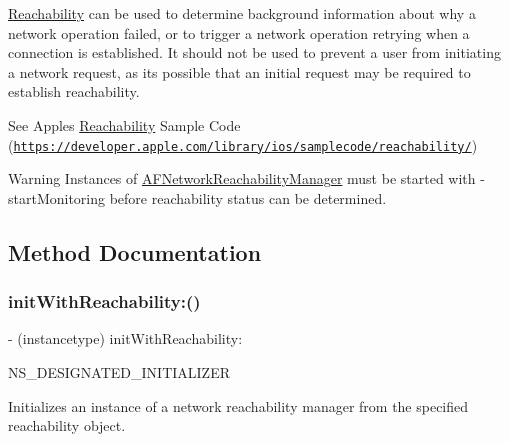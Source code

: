 \mbox{\hyperlink{interface_reachability}{Reachability}} can be used to determine background information about why a network operation failed, or to trigger a network operation retrying when a connection is established. It should not be used to prevent a user from initiating a network request, as it\textquotesingle{}s possible that an initial request may be required to establish reachability.

See Apple\textquotesingle{}s \mbox{\hyperlink{interface_reachability}{Reachability}} Sample Code (\href{https://developer.apple.com/library/ios/samplecode/reachability/}{\tt https\+://developer.\+apple.\+com/library/ios/samplecode/reachability/})

\begin{DoxyWarning}{Warning}
Instances of {\ttfamily \mbox{\hyperlink{interface_a_f_network_reachability_manager}{A\+F\+Network\+Reachability\+Manager}}} must be started with {\ttfamily -\/start\+Monitoring} before reachability status can be determined. 
\end{DoxyWarning}


\subsection{Method Documentation}
\mbox{\label{interface_a_f_network_reachability_manager_a14b6db66e80c81c86cb698e98f991392}} 
\subsubsection{\texorpdfstring{init\+With\+Reachability\+:()}{initWithReachability:()}\hspace{0.1cm}{\footnotesize\ttfamily [1/3]}}
{\footnotesize\ttfamily -\/ (instancetype) init\+With\+Reachability\+: \begin{DoxyParamCaption}\item[{(S\+C\+Network\+Reachability\+Ref)}]{N\+S\+\_\+\+D\+E\+S\+I\+G\+N\+A\+T\+E\+D\+\_\+\+I\+N\+I\+T\+I\+A\+L\+I\+Z\+ER }\end{DoxyParamCaption}}

Initializes an instance of a network reachability manager from the specified reachability object.


